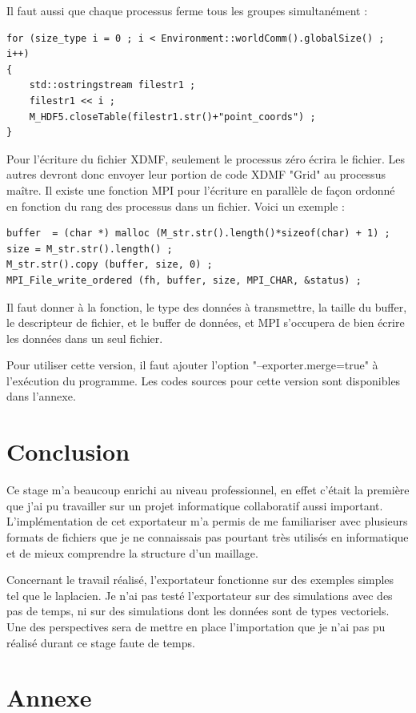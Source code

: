 \documentclass[12pt]{article}
\begin{document}
Il faut aussi que chaque processus ferme tous les groupes simultanément :
\begin{lstlisting}
for (size_type i = 0 ; i < Environment::worldComm().globalSize() ; i++)
{
    std::ostringstream filestr1 ;
    filestr1 << i ;
    M_HDF5.closeTable(filestr1.str()+"point_coords") ;
}
\end{lstlisting}
Pour l'écriture du fichier XDMF, seulement le processus zéro écrira le fichier. Les autres devront donc envoyer leur portion de code XDMF "Grid" au processus maître. Il existe une fonction MPI pour l'écriture en parallèle de façon ordonné en fonction du rang des processus dans un fichier.\newline
Voici un exemple : 
\begin{lstlisting}
buffer  = (char *) malloc (M_str.str().length()*sizeof(char) + 1) ;
size = M_str.str().length() ; 
M_str.str().copy (buffer, size, 0) ;
MPI_File_write_ordered (fh, buffer, size, MPI_CHAR, &status) ;
\end{lstlisting}
Il faut donner à la fonction, le type des données à transmettre, la taille du buffer, le descripteur de fichier, et le buffer de données, et MPI s'occupera de bien écrire les données dans un seul fichier.

Pour utiliser cette version, il faut ajouter l'option "--exporter.merge=true" à l'exécution du programme.
Les codes sources pour cette version sont disponibles dans l'annexe.
\newpage
\section {Conclusion}
Ce stage m'a beaucoup enrichi au niveau professionnel, en effet c'était la première que j'ai pu travailler sur un projet informatique collaboratif aussi important. L'implémentation de cet exportateur m'a permis de me familiariser avec plusieurs formats de fichiers que je ne connaissais pas pourtant très utilisés en informatique et de mieux comprendre la structure d'un maillage.\newline

Concernant le travail réalisé, l'exportateur fonctionne sur des exemples simples tel que le laplacien. Je n'ai pas testé l'exportateur sur des simulations avec des pas de temps, ni sur des simulations dont les données sont de types vectoriels. Une des perspectives sera de mettre en place l'importation que je n'ai pas pu réalisé durant ce stage faute de temps.
\newpage
\section {Annexe}
\end{document}
